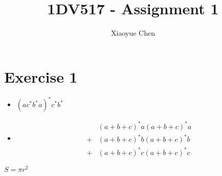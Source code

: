 \documentclass{article}
\title{1DV517 - Assignment 1}
\author{Xiaoyue Chen}
\begin{document}
\maketitle

\section*{Exercise 1}
\begin{itemize}
	\item $(a c^* b^* a)^* c^* b^*$
	\item
	      \begin{align*}
		        & (a+b+c)^* a (a+b+c)^* a \\
		      + & (a+b+c)^* b (a+b+c)^* b \\
		      + & (a+b+c)^* c (a+b+c)^* c
	      \end{align*}
\end{itemize}
$S = \pi r^2$
\end{document}
